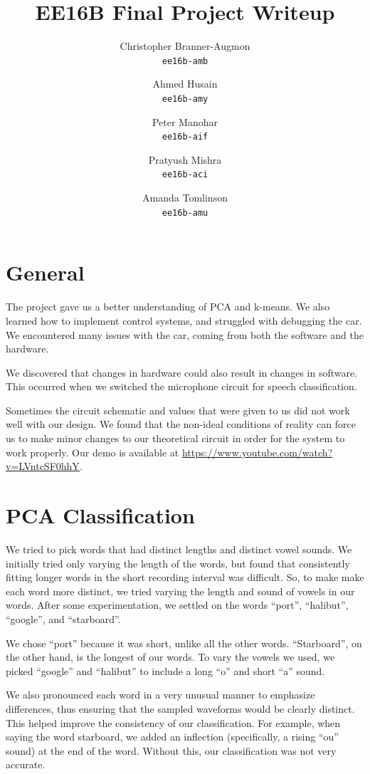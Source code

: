 \documentclass{article}
\title{\textsc{EE16B} Final Project Writeup}
\author{%
        Christopher Branner-Augmon \\
          \texttt{ee16b-amb}
        \and
        Ahmed Husain \\
          \texttt{ee16b-amy}
        \and
        Peter Manohar \\
          \texttt{ee16b-aif}
        \and
        Pratyush Mishra \\
        \texttt{ee16b-aci}
        \and
        Amanda Tomlinson\\
        \texttt{ee16b-amu}
      }
\begin{document}
\maketitle
\section*{General}

\indent The project gave us a better understanding of PCA and k-means. We also learned how
to implement control systems, and struggled with debugging the car. We encountered many issues with the car, coming from both the software and the hardware.

We discovered that changes in hardware could also result in changes in software. This occurred when we switched the microphone circuit for speech classification.

Sometimes the circuit schematic and values that were given
to us did not work well with our design. We found that the non-ideal conditions of reality can force us to make minor changes to our theoretical circuit in order for the system to work properly.
Our demo is available at \url{https://www.youtube.com/watch?v=LVntcSF0hhY}.

\section*{PCA Classification}

We tried to pick words that had distinct lengths and distinct vowel sounds. We initially tried only varying the length of the words, but found that
consistently fitting longer words in the short recording interval was difficult.
So, to make make each word more distinct, we tried varying the length and sound
of vowels in our words. After some experimentation, we settled on the words
``port'', ``halibut'', ``google'', and ``starboard''.

We chose ``port'' because it was short, unlike all the other words.
``Starboard'', on the other hand, is the longest of our words. To vary the
vowels we used, we picked ``google'' and ``halibut'' to include a long ``o''
and short ``a'' sound.

We also pronounced each word in a very unusual manner to emphasize differences, thus
ensuring that the sampled waveforms would be clearly distinct.  This helped
improve the consistency of our classification. For example, when saying the
word starboard, we added an inflection (specifically, a rising ``ou'' sound) at
the end of the word. Without this, our classification was not very accurate.
\end{document}
